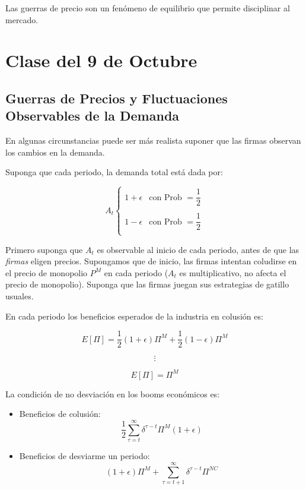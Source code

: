 \documentclass[letterpaper,12pt,twocolumn]{report}
\begin{document}
Las guerras de precio son un fenómeno de equilibrio que permite disciplinar al mercado.

\section{Clase del 9 de Octubre}

\subsection*{Guerras de Precios y Fluctuaciones Observables de la Demanda}

En algunas circunstancias puede ser más realista suponer que las firmas observan los cambios en la demanda. 

Suponga que cada periodo, la demanda total está dada por:

$$ A_t \begin{cases}
	1+\epsilon & \text{con Prob } =\dfrac{1}{2} \\
	\\
	1-\epsilon & \text{con Prob } =\dfrac{1}{2} \\
	
\end{cases} $$

Primero suponga que $A_t$ es observable al inicio de cada periodo, antes de que las \textit{firmas} eligen precios. Supongamos que de inicio, las firmas intentan coludirse en el precio de monopolio $P^{M}$ en cada periodo ($A_t$ es multiplicativo, no afecta el precio de monopolio). Suponga que las firmas juegan sus estrategias de gatillo usuales.

En cada periodo los beneficios esperados de la industria en colusión es:

$$  E[\Pi] = \dfrac{1}{2}(1+\epsilon)\Pi^M + \dfrac{1}{2}(1-\epsilon)\Pi^M $$

$$ \vdots $$

$$ E[\Pi]=\Pi^M $$

La condición de no desviación en los booms económicos es:

\begin{itemize}
	\item Beneficios de colusión: $$ \dfrac{1}{2} \sum_{\tau=t}^{\infty}\delta ^{\tau-t}\Pi^M(1+\epsilon) $$
	
	\item Beneficios de desviarme un periodo: $$ (1+\epsilon)\Pi^{M}+\sum_{\tau=t+1}^{ \infty} \delta^{\tau-t}\Pi^{NC} $$
\end{itemize}
\end{document}
